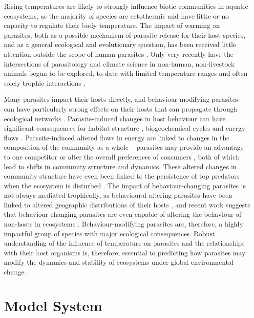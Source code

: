 Rising temperatures are likely to strongly influence biotic communities in aquatic ecosystems, as the majority of species are ectothermic and have little or no capacity to regulate their body temperature. The impact of warming on parasites, both as a possible mechanism of parasite release for their host species, and as a general ecological and evolutionary question, has been received little attention outside the scope of human parasites \citep{gonzalez2010, scott1984}. Only very recently have the intersections of parasitology and climate science in non-human, non-livestock animals begun to be explored, to-date with limited temperature ranges \citep{labaude2017} and often solely trophic interactions \citep{laverty2017}. 

Many parasites impact their hosts directly, and behaviour-modifying parasites can have particularly strong effects on their hosts that can propagate through ecological networks \citep{labaude2015}. Parasite-induced changes in host behaviour can have significant consequences for habitat structure \citep{mouritsen2005}, biogeochemical cycles \citep{vannatta2018} and energy flows \citep{sato2011}. Parasite-induced altered flows in energy are linked to changes in the composition of the community as a whole – parasites may provide an advantage to one competitor \citep{hatcher2014} or alter the overall preferences of consumers \citep{bernot2007, bunke2015, sato2011}, both of which lead to shifts in community structure and dynamics. These altered changes in community structure have even been linked to the persistence of top predators when the ecosystem is disturbed \citep{lefevre2009}. The impact of behaviour-changing parasites is not always mediated trophically, as behavioural-altering parasites have been linked to altered geographic distributions of their hosts \citep{frick2015}, and recent work suggests that behaviour changing parasites are even capable of altering the behaviour of non-hosts in ecosystems \citep{demandt2018}. 
Behaviour-modifying parasites are, therefore, a highly impactful group of species with major ecological consequences. Robust understanding of the influence of temperature on parasites and the relationships with their host organisms is, therefore, essential to predicting how parasites may modify the dynamics and stability of ecosystems under global environmental change. 

\section{Model System}

